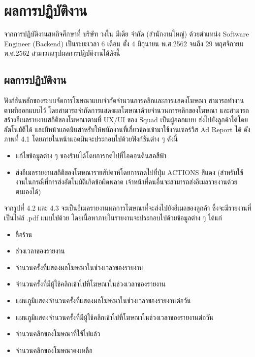 \chapter{ผลการปฏิบัติงาน}
\label{chapter:result}
จากการปฏิบัติงานสหกิจศึกษาที่ บริษัท วงใน มีเดีย จำกัด (สำนักงานใหญ่) ด้วยตำแหน่ง Software Engineer (Backend) เป็นระยะเวลา 6 เดือน ตั้ง 4 มิถุนายน พ.ศ.2562 จนถึง 29 พฤศจิกายน พ.ศ.2562 สามารถสรุปผลการปฏิบัติงานได้ดังนี้
	
\section{ผลการปฏิบัติงาน}
ฟังก์ชันหลักของระบบจัดการโฆษณาแบบจำกัดจำนวนการคลิกและการแสดงโฆษณา สามารถทำงานตามที่ออกแบบไว้ โดยสามารถจำกัดการแสดงผลโฆษณาด้วยจำนวนการคลิกของโฆษณา และสามารถสร้างอีเมลรายงานสถิติของโฆษณาตามที่ UX/UI ของ Squad เป็นผู้ออกแบบ ส่งไปยังลูกค้าได้โดยอัตโนมัติได้ และมีหน้าแอดมินสำหรับให้พนักงานที่เกี่ยวข้องเข้ามาใช้งานเซอร์วิส Ad Report ได้ ดังภาพที่ 4.1 โดยภายในหน้าแอดมินจะประกอบไปด้วยฟังก์ชันต่าง ๆ ดังนี้

\begin{itemize}
	\item แก้ไขข้อมูลต่าง ๆ ของร้านได้โดยการกดไปที่ไอคอนดินสอสีฟ้า
	\item ส่งอีเมลรายงานสถิติของโฆษณารายสัปดาห์โดยการกดไปที่ปุ่ม ACTIONS สีแดง (สำหรับใช้งานในกรณีที่การส่งอัตโนมัติเกิดข้อผิดพลาด เจ้าหน้าที่คนอื่นจะสามารถส่งอีเมลรายงานด้วยตนเองได้) 
\end{itemize}

จากรูปที่ 4.2 และ 4.3 จะเป็นอีเมลรายงานผลการโฆษณาที่จะส่งไปยังอีเมลของลูกค้า ซึ่งจะมีรายงานที่เป็นไฟล์ .pdf แนบไปด้วย โดยเนื้อหาภายในรายงานจะประกอบไปด้วยข้อมูลต่าง ๆ ได้แก่

\begin{itemize}
	\item ชื่อร้าน
	\item ช่วงเวลาของรายงาน
	\item จำนวนครั้งที่แสดงผลโฆษณาในช่วงเวลาของรายงาน
	\item จำนวนครั้งที่มีผู้ใช้คลิกเข้าไปที่โฆษณาในช่วงเวลาของรายงาน
	\item แผนภูมิแสดงจำนวนครั้งที่แสดงผลโฆษณาในช่วงเวลาของรายงานต่อวัน
	\item แผนภูมิแสดงจำนวนครั้งที่มีผู้ใช้คลิกเข้าไปที่โฆษณาในช่วงเวลาของรายงานต่อวัน
	\item จำนวนคลิกของโฆษณาที่ใช้ไปแล้ว
	\item จำนวนคลิกของโฆษณาคงเหลือ
\end{itemize}

